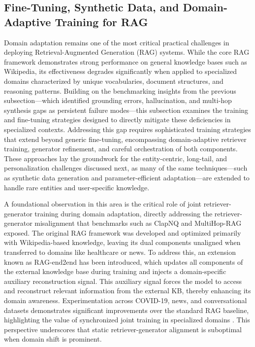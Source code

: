 \documentclass[11pt]{article}
\begin{document}
\subsection{Fine-Tuning, Synthetic Data, and Domain-Adaptive Training for RAG}

Domain adaptation remains one of the most critical practical challenges in deploying Retrieval-Augmented Generation (RAG) systems. While the core RAG framework demonstrates strong performance on general knowledge bases such as Wikipedia, its effectiveness degrades significantly when applied to specialized domains characterized by unique vocabularies, document structures, and reasoning patterns. Building on the benchmarking insights from the previous subsection---which identified grounding errors, hallucination, and multi-hop synthesis gaps as persistent failure modes---this subsection examines the training and fine-tuning strategies designed to directly mitigate these deficiencies in specialized contexts. Addressing this gap requires sophisticated training strategies that extend beyond generic fine-tuning, encompassing domain-adaptive retriever training, generator refinement, and careful orchestration of both components. These approaches lay the groundwork for the entity-centric, long-tail, and personalization challenges discussed next, as many of the same techniques---such as synthetic data generation and parameter-efficient adaptation---are extended to handle rare entities and user-specific knowledge.

A foundational observation in this area is the critical role of joint retriever-generator training during domain adaptation, directly addressing the retriever-generator misalignment that benchmarks such as ClapNQ and MultiHop-RAG exposed. The original RAG framework was developed and optimized primarily with Wikipedia-based knowledge, leaving its dual components unaligned when transferred to domains like healthcare or news. To address this, an extension known as RAG-end2end has been introduced, which updates all components of the external knowledge base during training and injects a domain-specific auxiliary reconstruction signal. This auxiliary signal forces the model to access and reconstruct relevant information from the external KB, thereby enhancing its domain awareness. Experimentation across COVID-19, news, and conversational datasets demonstrates significant improvements over the standard RAG baseline, highlighting the value of synchronized joint training in specialized domains \cite{ref78}. This perspective underscores that static retriever-generator alignment is suboptimal when domain shift is prominent.
\end{document}
